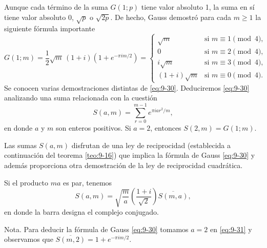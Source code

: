 \documentclass[12pt,a4paper]{book}
\begin{document}
    Aunque cada término de la suma $G(1;p)$ tiene valor absoluto 1, la suma en sí tiene
    valor absoluto $0$, $\sqrt{p}$ o $\sqrt{2p}$. De hecho, Gauss demostró para cada
    $m\geq1$ la siguiente fórmula importante
    \begin{equation}\label{eq:9-30}
        G(1;m)=\frac{1}{2}\sqrt{m}\,(1+i)\left(1+e^{-\pi im/2}\right)=
        \begin{cases}
            \sqrt{m}&\text{si }m\equiv1\pmod{4},\\
            0&\text{si }m\equiv2\pmod{4},\\
            i\sqrt{m}&\text{si }m\equiv3\pmod{4},\\
            (1+i)\sqrt{m}&\text{si }m\equiv0\pmod{4}.
        \end{cases}
    \end{equation}
    Se conocen varias demostraciones distintas de \eqref{eq:9-30}. Deduciremos
    \eqref{eq:9-30} analizando una suma relacionada con la cuestión
    \begin{equation*}
        S(a,m)=\sum_{r=0}^{m-1}e^{\pi iar^{2}/m},
    \end{equation*}
    en donde $a$ y $m$ son enteros positivos. Si $a=2$, entonces $S(2,m)=G(1;m)$.

    Las sumas $S(a,m)$ disfrutan de una ley de reciprocidad (establecida a continuación
    del teorema \ref{teo:9-16}) que implica la fórmula de Gauss \eqref{eq:9-30} y además
    proporciona otra demostración de la ley de reciprocidad cuadrática.

    \begin{teorema}\label{teo:9-16}
        Si el producto $ma$ es par, tenemos
        \begin{equation}\label{eq:9-31}
            S(a,m)=\sqrt{\frac{m}{a}}\left(\frac{1+i}{\sqrt{2}}\right)\overline{S(m,a)},
        \end{equation}
        en donde la barra designa el complejo conjugado.
    \end{teorema}

    Nota. Para deducir la fórmula de Gauss \eqref{eq:9-30} tomamos $a=2$ en
    \eqref{eq:9-31} y observamos que $\overline{S(m,2)}=1+e^{-\pi im/2}$.
\end{document}
